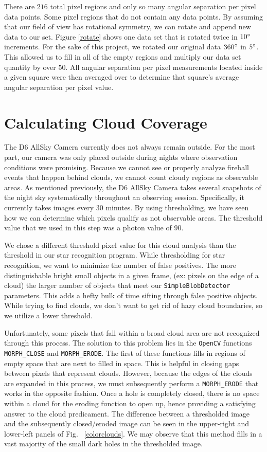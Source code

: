There are $216$ total pixel regions and only so many angular separation per pixel data points.
Some pixel regions that do not contain any data points.
By assuming that our field of view has rotational symmetry, we can rotate and append new data to our set.
Figure \ref{rotate} shows one data set that is rotated twice in $10 \degree$ increments.
For the sake of this project, we rotated our original data $360 \degree$ in $5 \degree$.  
This allowed us to fill in all of the empty regions and multiply our data set quantity by over $50$.
All angular separation per pixel measurements located inside a given square were then averaged over to determine that square's average angular separation per pixel value.

\section{Calculating Cloud Coverage}

The D6 AllSky Camera currently does not always remain outside.
For the most part, our camera was only placed outside during nights where observation conditions were promising.
Because we cannot see or properly analyze fireball events that happen behind clouds, we cannot count cloudy regions as observable areas.
As mentioned previously, the D6 AllSky Camera takes several snapshots of the night sky systematically throughout an observing session.
Specifically, it currently takes images every $30$ minutes.
By using thresholding, we have seen how we can determine which pixels qualify as not observable areas.
The threshold value that we used in this step was a photon value of $90$.


We chose a different threshold pixel value for this cloud analysis than the threshold in our star recognition program.
While thresholding for star recognition, we want to minimize the number of false positives.
The more distinguishable bright small objects in a given frame, (ex: pixels on the edge of a cloud) the larger number of objects that meet our \texttt{SimpleBlobDetector} parameters.
This adds a hefty bulk of time sifting through false positive objects.
While trying to find clouds, we don't want to get rid of hazy cloud boundaries, so we utilize a lower threshold.

Unfortunately, some pixels that fall within a broad cloud area are not recognized through this process.
The solution to this problem lies in the \texttt{OpenCV} functions \texttt{MORPH\_CLOSE} and \texttt{MORPH\_ERODE}.
The first of these functions fills in regions of empty space that are next to filled in space.
This is helpful in closing gaps between pixels that represent clouds.
However, because the edges of the clouds are expanded in this process, we must subsequently perform a \texttt{MORPH\_ERODE} that works in the opposite fashion.
Once a hole is completely closed, there is no space within a cloud for the eroding function to open up, hence providing a satisfying answer to the cloud predicament. 
The difference between a thresholded image and the subsequently closed/eroded image can be seen in the upper-right and lower-left panels of Fig. ~\ref{colorclouds}.
We may observe that this method fills in a vast majority of the small dark holes in the thresholded image.

